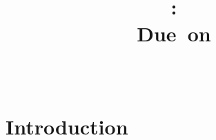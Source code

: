 \documentclass{article}
\title{
\vspace{2in}
\textmd{\textbf{\hmwkClass:\ \hmwkTitle}}\\
\normalsize\vspace{0.1in}\small{Due\ on\ \hmwkDueDate}\\
\vspace{0.1in}\large{\textit{\hmwkClassInstructor\ \hmwkClassTime}}
\vspace{3in}
}
\author{\textbf{\hmwkAuthorName}}
\date{} %
\begin{document}
\maketitle



\newpage
\tableofcontents
\newpage



\section{Introduction}
\end{document}

